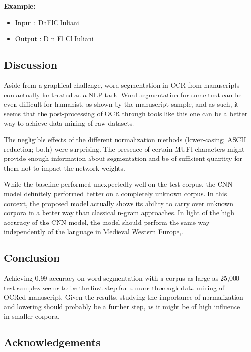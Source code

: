 \documentclass{jdmdh}
\begin{document}
\textbf{Example:}

\begin{itemize}
    \item Input : DnFlClIuliani 
    \item Output : D n Fl Cl Iuliani
\end{itemize}

\subsection{Discussion}

Aside from a graphical challenge, word segmentation in OCR from manuscripts can actually be treated as a NLP task. Word segmentation for some text can be even difficult for humanist, as shown by the manuscript sample, and as such, it seems that the post-processing of OCR through tools like this one can be a better way to achieve data-mining of raw datasets.

The negligible effects of the different normalization methods (lower-casing; ASCII reduction; both) were surprising. The presence of certain MUFI characters might provide enough information about segmentation and be of sufficient quantity for them not to impact the network weights. 

While the baseline performed unexpectedly well on the test corpus, the CNN model definitely performed better on a completely unknown corpus. In this context, the proposed model actually shows its ability to carry over unknown corpora in a better way than classical n-gram approaches. In light of the high accuracy of the CNN model, the model should perform the same way independently of the language in Medieval Western Europe,.

\subsection{Conclusion}

Achieving 0.99 accuracy on word segmentation with a corpus as large as 25,000 test samples seems to be the first step for a more thorough data mining of OCRed manuscript. Given the results, studying the importance of normalization and lowering should probably be a further step, as it might be of high influence in smaller corpora. 

\subsection{Acknowledgements}
\end{document}
